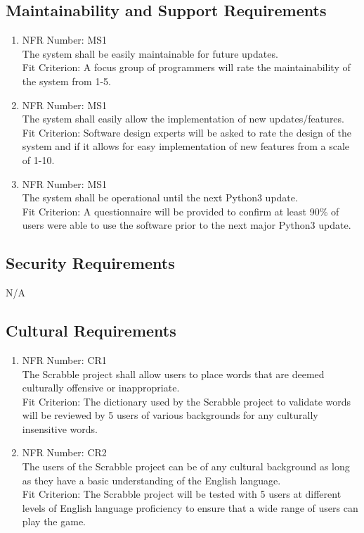 \documentclass[12pt, titlepage]{article}
\begin{document}
\subsection{Maintainability and Support Requirements}
\begin{enumerate}
    \item NFR Number: MS1\\ %
    The system shall be easily maintainable for future updates.\\
    Fit Criterion: A focus group of programmers will rate the maintainability of the system from 1-5.
    \item NFR Number: MS1\\ %
    The system shall easily allow the implementation of new updates/features.\\
    Fit Criterion: Software design experts will be asked to rate the design of the system and if it allows for easy implementation of new features from a scale of 1-10.
    \item NFR Number: MS1\\ %
    The system shall be operational until the next Python3 update.\\
    Fit Criterion: A questionnaire will be provided to confirm at least 90\% of users were able to use the software prior to the next major Python3 update.
\end{enumerate}

\subsection{Security Requirements}
N/A
\subsection{Cultural Requirements} %
\begin{enumerate}
    \item NFR Number: CR1 \\
    The Scrabble project shall allow users to place words that are deemed culturally offensive or inappropriate.  \\
    Fit Criterion: The dictionary used by the Scrabble project to validate words will be reviewed by 5 users of various backgrounds for any culturally insensitive words.
    \item NFR Number: CR2\\
    The users of the Scrabble project can be of any cultural background as long as they have a basic understanding of the English language.\\
    Fit Criterion: The Scrabble project will be tested with 5 users at different levels of English language proficiency to ensure that a wide range of users can play the game. 
\end{enumerate}
\end{document}
